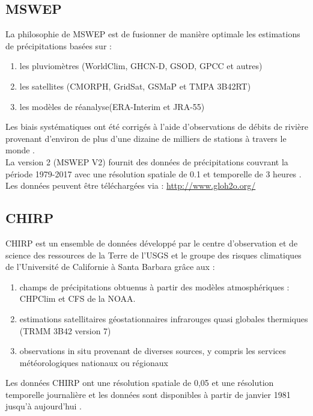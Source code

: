 \subsection{MSWEP}
La philosophie  de MSWEP est de fusionner de manière optimale les estimations de précipitations basées sur :
\begin{enumerate}
\item les pluviomètres (WorldClim, GHCN-D, GSOD, GPCC et autres)
\item les satellites (CMORPH, GridSat, GSMaP et TMPA 3B42RT)
\item les modèles de r\'eanalyse(ERA-Interim et JRA-55)
\end{enumerate}
 
 Les biais systématiques ont \'et\'e corrig\'es \`a l'aide d'observations de débits de rivière provenant d'environ de plus d'une dizaine de milliers de stations à travers le monde \cite{beck_mswep:_2017}.\\
La version 2 (MSWEP V2) fournit des données de précipitations couvrant la période 1979-2017 avec une  résolution spatiale de 0.1 et temporelle de 3 heures \cite{beck_mswep_2018}. Les données peuvent être téléchargées via : \url{http://www.gloh2o.org/}
 
\subsection{CHIRP}
CHIRP est un ensemble de données  développé par le centre d'observation et de science des ressources de la Terre de l'USGS et le groupe des risques climatiques de l'Université de Californie à Santa Barbara gr\^ace aux  \cite{katsanos_analysis_2016} : 
\begin{enumerate}
\item  champs de précipitations obtuenus \`a partir des modèles  atmosphériques : CHPClim et CFS  de la NOAA. 
\item estimations satellitaires géostationnaires infrarouges quasi globales thermiques (TRMM 3B42 version 7)
\item  observations in situ provenant de diverses sources, y compris les services météorologiques nationaux ou régionaux
\end{enumerate}  

Les donn\'ees CHIRP ont une résolution spatiale de 0,05 et une résolution temporelle journalière et les données sont disponibles à partir de janvier 1981 jusqu'à aujourd'hui \cite{kimani_assessment_2017}.\\










